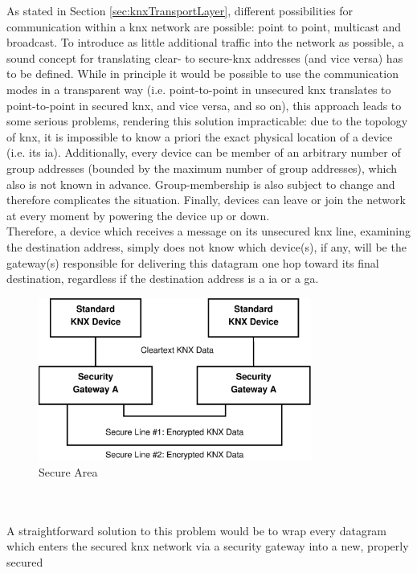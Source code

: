 As stated in Section \ref{sec:knxTransportLayer}, different possibilities for communication within a \gls{knx} network are possible: point to point, multicast and broadcast.
To introduce as little additional traffic into the network as possible, a sound concept for translating clear- to secure-\gls{knx} addresses (and vice versa) has to
be defined. While in principle it would be possible to use the communication modes in a transparent way (i.e. point-to-point in unsecured \gls{knx} translates
to point-to-point in secured \gls{knx}, and vice versa, and so on), this approach leads to some serious problems, rendering this solution impracticable:
due to the topology of \gls{knx}, it is impossible to know a priori the exact physical location of a device (i.e. its \gls{ia}). Additionally,
every device can be member of an arbitrary number of group addresses (bounded by the maximum number of group addresses), which also is not known in advance.
Group-membership is also subject to change and therefore complicates the situation. Finally, devices can leave or join the network at every moment by powering the
device up or down.
\\
Therefore, a device which receives a message on its unsecured \gls{knx} line, examining the destination address, simply does
not know which device(s), if any, will be the gateway(s) responsible for delivering this datagram one hop toward its final destination,
regardless if the destination address is a \gls{ia} or a \gls{ga}.
\begin{figure}
    \centering
    \includegraphics[width=0.8\textwidth]{figures/SecureArea.eps}
    \caption{Secure Area}
    \label{fig:secArea}
\end{figure}
\\
\\
A straightforward solution to this problem would be to wrap every datagram which enters the secured \gls{knx} network via a security gateway into a new, properly secured
